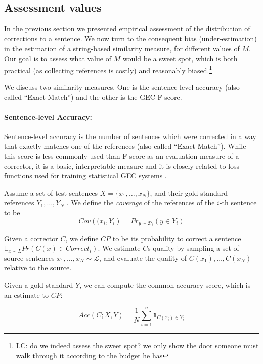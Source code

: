 \documentclass[letter,11pt]{article}
\newcommand{\lc}[1]{\footnote{\color{green}LC: #1}}
\begin{document}
\subsection{Assessment values} \label{subsec:Assessment-values}

In the previous section we presented empirical assessment of the distribution of
corrections to a sentence. We now turn to the consequent bias (under-estimation) in the estimation of a string-based similarity measure, for different values of $M$. Our goal is to assess what value of $M$ would be a sweet spot, which is both practical (as collecting references is costly) and reasonably biased.\lc{do we indeed assess the sweet spot? we only show the door someone must walk through it according to the budget he has}

We discuss two similarity measures. One is the sentence-level accuracy (also called ``Exact Match'') and the other is the GEC F-score.
 
\paragraph{Sentence-level Accuracy:}
Sentence-level accuracy is the number of sentences which were corrected in a way that exactly matches one of the
references (also called ``Exact Match''). While this score is less commonly used than F-score as an evaluation
measure of a corrector, it is a basic, interpretable measure and it is closely related to loss functions used for
training statistical GEC systems \cite{rozovskaya2010training,chodorow2012problems,rozovskaya2013joint}. 

Assume a set of test sentences $X=\{x_1,\ldots,x_N\}$,
and their gold standard references $Y_1,\ldots,Y_N$ . We define the
{\it coverage} of the references of the $i$-th sentence to be
\begin{equation}
  Cov\left((x_i,Y_i\right)=Pr_{y \sim \mathcal{D}_i}\left(y \in Y_i\right)
\end{equation}

Given a corrector $C$, we define $CP$ to be its probability to correct a sentence $\mathbb{E}_{x\sim{L}}Pr\left(C\left(x\right)\in Correct_i\right)$. We estimate $C$s quality by sampling a set of source sentences
$x_1,\ldots,x_N \sim \mathcal{L}$, and evaluate the quality of $C(x_1),\ldots,C(x_N)$ relative
to the source. 

Given a gold standard $Y$, we can compute the common accuracy score, which is an estimate to $CP$:

\begin{equation}
  Acc(C;X,Y) = \frac{1}{N} \sum_{i=1}^n \mathds{1}_{C(x_i) \in Y_i}
\end{equation}
\end{document}
